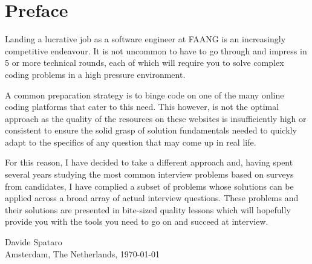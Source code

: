 \chapter*{Preface}

Landing a lucrative job as a software engineer at FAANG is an increasingly competitive endeavour. It is not uncommon to have to go through and impress in 5 or more technical rounds, each of which will require you to solve complex coding problems in a high pressure environment. 

A common preparation strategy is to binge code on one of the many online coding platforms that cater to this need. This however, is not the optimal approach as the quality of the resources on these websites is insufficiently high or consistent to ensure the solid grasp of solution fundamentals needed to quickly adapt to the specifics of any question that may come up in real life.

For this reason, I have decided to take a different approach and, having spent several years studying the most common interview problems based on surveys from candidates, I have complied a subset of problems whose solutions can be applied across a broad array of actual interview questions. These problems and their solutions are presented in bite-sized quality lessons which will hopefully provide you with the tools you need to go on and succeed at interview. 


\medskip
\begin {flushright}
  Davide Spataro \hfill \\
  Amsterdam, The Netherlands, \today
\end {flushright}